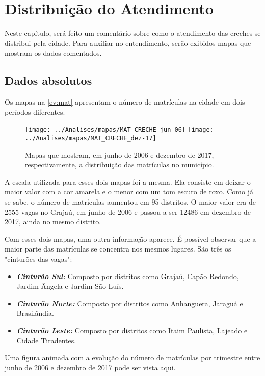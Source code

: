 \chapter{Distribuição do Atendimento}
\label{cap:distribuicao}

Neste capítulo, será feito um comentário sobre como o atendimento das creches se distribui pela cidade. Para auxiliar no entendimento, serão exibidos mapas que mostram os dados comentados.

\section{Dados absolutos}

Os mapas na \autoref{ev:mat} apresentam o número de matrículas na cidade em dois períodos diferentes.

\begin{figure}[H]
	\centering
	\texttt{[image: ../Analises/mapas/MAT\_CRECHE\_jun-06]}
	\texttt{[image: ../Analises/mapas/MAT\_CRECHE\_dez-17]}
	\caption{Mapas que mostram, em junho de 2006 e dezembro de 2017, respectivamente, a distribuição das matrículas no município.}
	\label{ev:mat}
\end{figure}

A escala utilizada para esses dois mapas foi a mesma. Ela consiste em deixar o maior valor com a cor amarela e o menor com um tom escuro de roxo. Como já se sabe, o número de matrículas aumentou em 95 distritos. O maior valor era de 2555 vagas no Grajaú, em junho de 2006 e passou a ser 12486 em dezembro de 2017, ainda no mesmo distrito.

Com esses dois mapas, uma outra informação aparece. É possível observar que a maior parte das matrículas se concentra nos mesmos lugares. São três os "cinturões das vagas": 

\begin{itemize}
	\item \textit{\textbf{Cinturão Sul:}} Composto por distritos como Grajaú, Capão Redondo, Jardim Ângela e Jardim São Luís.
	\item \textit{\textbf{Cinturão Norte:}} Composto por distritos como Anhanguera, Jaraguá e Brasilândia.
	\item \textit{\textbf{Cinturão Leste:}} Composto por distritos como Itaim Paulista, Lajeado e Cidade Tiradentes.
\end{itemize}

Uma figura animada com a evolução do número de matrículas por trimestre entre junho de 2006 e dezembro de 2017 pode ser vista \href{https://lsflp.github.io/MAC0213/Multimidia/MAT_CRECHE.gif}{aqui}.

